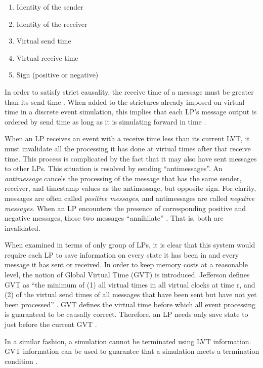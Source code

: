 \documentclass[11pt]{book}
\begin{document}
\begin{enumerate}
  \item Identity of the sender
  \item Identity of the receiver
  \item Virtual send time
  \item Virtual receive time
  \item Sign (positive or negative)
\end{enumerate}

In order to satisfy strict causality, the receive time of a message must be
greater than its send time \cite{lamport-78}. When added to the strictures
already imposed on virtual time in a discrete event simulation, this implies
that each LP's message output is ordered by send time as long as it is
simulating forward in time \cite{jefferson-85}.

When an LP receives an event with a receive time less than its current LVT, it
must invalidate all the processing it has done at virtual times after that
receive time. This process is complicated by the fact that it may also have sent
messages to other LPs. This situation is resolved by sending
``antimessages''. An \textit{antimessage} cancels the processing of the message
that has the same sender, receiver, and timestamp values as the antimessage, but
opposite sign. For clarity, messages are often called \textit{positive
  messages}, and antimessages are called \textit{negative messages}. When an LP
encounters the presence of corresponding positive and negative messages, those
two messages ``annihilate'' \cite{jefferson-85}. That is, both are invalidated.

When examined in terms of only group of LPs, it is clear that this system would
require each LP to save information on every state it has been in and every
message it has sent or received. In order to keep memory costs at a reasonable
level, the notion of Global Virtual Time (GVT) is introduced. Jefferson defines
GVT as ``the minimum of (1) all virtual times in all virtual clocks at time r,
and (2) of the virtual send times of all messages that have been sent but have
not yet been processed'' \cite{jefferson-85}. GVT defines the virtual time
before which all event processing is guaranteed to be causally
correct. Therefore, an LP needs only save state to just before the current GVT
\cite{fujimoto-89b}.

In a similar fashion, a simulation cannot be terminated using LVT
information. GVT information can be used to guarantee that a simulation meets a
termination condition \cite{jefferson-85}.
\end{document}
